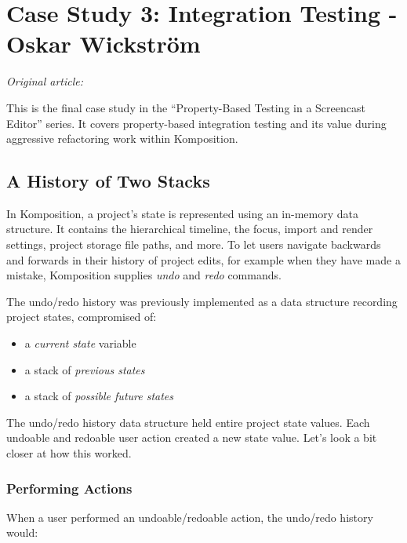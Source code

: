\chapter{Case Study 3: Integration Testing - Oskar Wickstr\"om}
\label{sec:integration_testing}

\vspace{\baselineskip}
\noindent\textit{Original article: \cite{integration_testing}}
\vspace{\baselineskip}

\noindent This is the final case study in the ``Property-Based Testing in a Screencast Editor'' series. It covers property-based integration testing and its value during aggressive refactoring work within Komposition.

\section{A History of Two Stacks}


In Komposition, a project's state is represented using an in-memory data structure. It contains the hierarchical timeline, the focus, import and render settings, project storage file paths, and more. To let users navigate backwards and forwards in their history of project edits, for example when they have made a mistake, Komposition supplies \textit{undo} and \textit{redo} commands.

The undo/redo history was previously implemented as a data structure recording project states, compromised of:

\begin{itemize}
\item a \textit{current state} variable
\item a stack of \textit{previous states}
\item a stack of \textit{possible future states}
\end{itemize}
The undo/redo history data structure held entire project state values. Each undoable and redoable user action created a new state value. Let's look a bit closer at how this worked.

\subsection{Performing Actions}


When a user performed an undoable/redoable action, the undo/redo history would:

